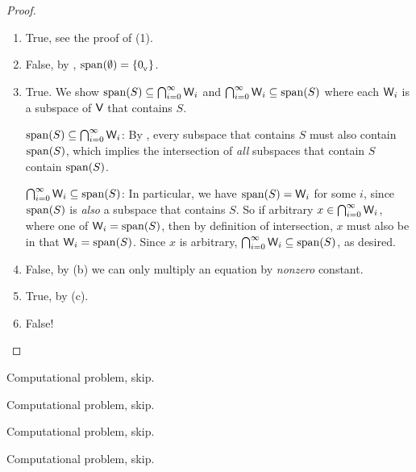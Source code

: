 \begin{proof}\ 

\begin{enumerate}
\item True, see the proof of (1).
\item False, by , \(\operatorname{span}(\emptyset) = \{ 0_{_{\textsf{V}}} \}\).
\item True.
      We show \(\operatorname{span}(S) \subseteq \bigcap_{i = 0}^{\infty} \textsf{W}_i\) and \(\bigcap_{i = 0}^{\infty} \textsf{W}_i \subseteq \operatorname{span}(S)\) where each \(\textsf{W}_i\) is a subspace of \(\textsf{V}\) that contains \(S\).
      
      \(\operatorname{span}(S) \subseteq \bigcap_{i = 0}^{\infty} \textsf{W}_i\): By , every subspace that contains \(S\) must also contain \(\operatorname{span}(S)\), which implies the intersection of \emph{all} subspaces that contain \(S\) contain \(\operatorname{span}(S)\).
      
      \(\bigcap_{i = 0}^{\infty} \textsf{W}_i \subseteq \operatorname{span}(S)\):
      In particular, we have \(\operatorname{span}(S) = \textsf{W}_i\) for some \(i\), since \(\operatorname{span}(S)\) is \emph{also} a subspace that contains \(S\).
      So if arbitrary \(x \in \bigcap_{i = 0}^{\infty} \textsf{W}_i\), where one of \(\textsf{W}_i = \operatorname{span}(S)\), then by definition of intersection, \(x\) must also be in that \(\textsf{W}_i = \operatorname{span}(S)\).
      Since \(x\) is arbitrary, \(\bigcap_{i = 0}^{\infty} \textsf{W}_i \subseteq \operatorname{span}(S)\), as desired.
\item False, by (b) we can only multiply an equation by \emph{nonzero} constant.
\item True, by (c).
\item False!
\end{enumerate}
\end{proof}

\begin{exercise} \label{exercise 1.4.2}
Computational problem, skip.
\end{exercise}

\begin{exercise} \label{exercise 1.4.3}
Computational problem, skip.
\end{exercise}

\begin{exercise} \label{exercise 1.4.4}
Computational problem, skip.
\end{exercise}

\begin{exercise} \label{exercise 1.4.5}
Computational problem, skip.
\end{exercise}

